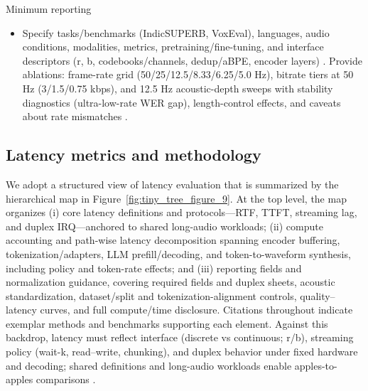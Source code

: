 \documentclass{article}
\begin{document}
Minimum reporting
\begin{itemize}
  \item Specify tasks/benchmarks (IndicSUPERB, VoxEval), languages, audio conditions, modalities, metrics, pretraining/fine-tuning, and interface descriptors (r, b, codebooks/channels, dedup/aBPE, encoder layers) \cite{cui2025voxevalbenchmarkingknowledgeunderstandin,entry2025indicsuperbspeechprocessinguniversalperf,ji2025languagecodecbridgingdiscreterepresentat,zhang2025impactframeratesspeechtokenizercasestudy,huang2024repcodecspeechrepresentationcodectokeniz}. Provide ablations: frame-rate grid (50/25/12.5/8.33/6.25/5.0 Hz), bitrate tiers at 50 Hz (3/1.5/0.75 kbps), and 12.5 Hz acoustic-depth sweeps with stability diagnostics (ultra-low-rate WER gap), length-control effects, and caveats about rate mismatches \cite{poli2025fastabxlibraryefficientcomputationabxdis,vashishth2024stabspeechtokenizerassessmentbenchmark,maimon2025salmonsuiteacousticlanguagemodelevaluati,wang2025tadicodectextawarediffusionspeechtokeniz,hsu2024exploringcontextlearningtextlessspeechla,li2024investigatingneuralaudiocodecsspeechlang}.
\end{itemize}

\subsection{Latency metrics and methodology} \label{subsec:latencymetricsandmethodology}
We adopt a structured view of latency evaluation that is summarized by the hierarchical map in Figure~\ref{fig:tiny_tree_figure_9}. At the top level, the map organizes (i) core latency definitions and protocols---RTF, TTFT, streaming lag, and duplex IRQ---anchored to shared long-audio workloads; (ii) compute accounting and path-wise latency decomposition spanning encoder buffering, tokenization/adapters, LLM prefill/decoding, and token-to-waveform synthesis, including policy and token-rate effects; and (iii) reporting fields and normalization guidance, covering required fields and duplex sheets, acoustic standardization, dataset/split and tokenization-alignment controls, quality--latency curves, and full compute/time disclosure. Citations throughout indicate exemplar methods and benchmarks supporting each element. Against this backdrop, latency must reflect interface (discrete vs continuous; r/b), streaming policy (wait-k, read--write, chunking), and duplex behavior under fixed hardware and decoding; shared definitions and long-audio workloads enable apples-to-apples comparisons \cite{li2025televaldynamicbenchmarkdesignedspokenlan}.
\end{document}
